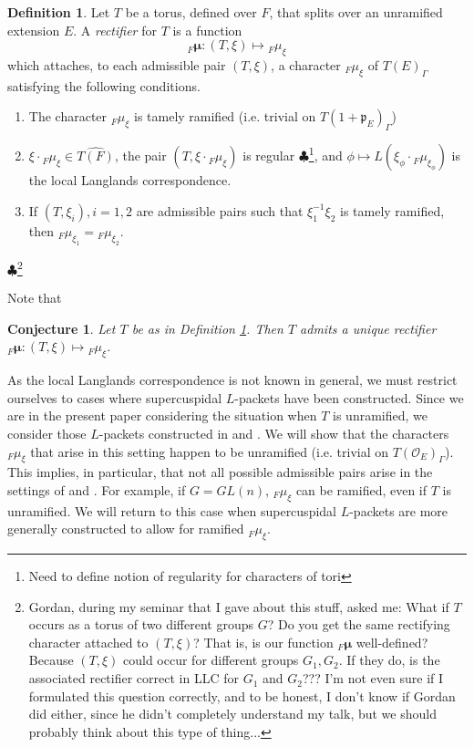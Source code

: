 \documentclass[11pt]{amsart}
\theoremstyle{plain}
\newtheorem{conjecture}[theorem]{Conjecture}
\newcommand{\MAxxx}[1]{$\clubsuit$\footnote{#1}}
\theoremstyle{definition}
\newtheorem{definition}[theorem]{Definition}
\begin{document}
\begin{definition}\label{rectifierdefinition}
  Let $T$ be a torus, defined over $F$, that splits over an unramified
  extension $E$.  A \emph{rectifier} for $T$ is a function $${}_F
  \boldsymbol\mu : (T, \xi) \mapsto {}_F \mu_{\xi}$$ which attaches,
  to each admissible pair $(T, \xi)$, a character ${}_F
  \mu_{\xi}$ of $T(E)_{\Gamma}$ satisfying the following conditions.

\begin{enumerate}
\item The character ${}_F \mu_{\xi}$ is tamely ramified (i.e. trivial on
  $T(1 + \mathfrak{p}_E)_{\Gamma}$)

\item $\xi \cdot {}_F \mu_{\xi} \in \widehat{T(F)}$, the pair $(T, \xi \cdot {}_F \mu_{\xi})$
 is regular \MAxxx{Need to define notion of regularity for characters
    of tori}, and $\phi \mapsto L(\xi_{\phi} \cdot {}_F \mu_{\xi_{\phi}})$
  is the local Langlands correspondence.

\item If $(T, \xi_i), i = 1,2$ are admissible pairs  such that
$\xi_1^{-1} \xi_2$ is tamely ramified, then
${}_F \mu_{\xi_1} = {}_F \mu_{\xi_2}$.
\end{enumerate}
\MAxxx{Gordan, during my seminar that I gave about this stuff, asked me:
What if $T$ occurs as a torus of two different groups $G$?  Do you
get the same rectifying character attached to $(T, \xi)$?  That is,
is our function ${}_F \boldsymbol\mu$ well-defined?  Because $(T,\xi)$
could occur for different groups $G_1, G_2$.  If they do, is the associated
rectifier correct in LLC for $G_1$ and $G_2$??? I'm not even sure if
I formulated this question correctly, and to be honest, I don't know
if Gordan did either, since he didn't completely understand my talk, but
we should probably think about this type of thing...}

\end{definition}

Note that

\begin{conjecture}
  Let $T$ be as in Definition \ref{rectifierdefinition}.  Then $T$
  admits a unique rectifier ${}_F \boldsymbol\mu : (T, \xi) \mapsto
  {}_F \mu_{\xi}$.
\end{conjecture}

As the local Langlands correspondence is not known in general, we must restrict
ourselves to cases where supercuspidal $L$-packets have been constructed.
Since we are in the present paper considering the situation when $T$ is unramified,
we consider those $L$-packets constructed in \cite{debackerreeder} and \cite{reeder}.
We will show that the characters ${}_F \mu_{\xi}$ that arise in this setting
happen to be unramified (i.e. trivial on $T(\mathcal{O}_E)_{\Gamma}$).  This implies,
in particular, that not all possible admissible pairs arise in the settings
of \cite{debackerreeder} and \cite{reeder}.
For example, if $G = GL(n)$, ${}_F \mu_{\xi}$ can be ramified,
even if $T$ is unramified.  We will return to this case when supercuspidal $L$-packets
are more generally constructed to allow for ramified ${}_F \mu_{\xi}$.
\end{document}
